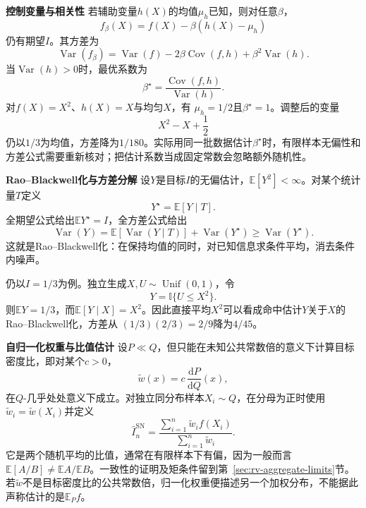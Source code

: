 \par\medskip\noindent\textbf{控制变量与相关性}\quad
若辅助变量\(h(X)\)的均值\(\mu_h\)已知，则对任意\(\beta\)，
\[ f_\beta(X)
  =f(X)-\beta(h(X)-\mu_h) \]
仍有期望\(I\)。其方差为
\[ \operatorname{Var}(f_\beta)
  =\operatorname{Var}(f)-2\beta\operatorname{Cov}(f,h)+\beta^2\operatorname{Var}(h). \]
当\(\operatorname{Var}(h)>0\)时，最优系数为
\[ \beta^\star
  =\frac{\operatorname{Cov}(f,h)}{\operatorname{Var}(h)}. \]
对\(f(X)=X^2\)、\(h(X)=X\)与均匀\(X\)，有
\(\mu_h=1/2\)且\(\beta^\star=1\)。调整后的变量
\[ X^2-X+\frac12 \]
仍以\(1/3\)为均值，方差降为\(1/180\)。实际用同一批数据估计\(\beta^\star\)时，有限样本无偏性和方差公式需要重新核对；把估计系数当成固定常数会忽略额外随机性。

\par\medskip\noindent\textbf{Rao--Blackwell化与方差分解}\quad
设\(Y\)是目标\(I\)的无偏估计，\(\mathbb{E}[Y^2]<\infty\)。对某个统计量\(T\)定义
\[ Y^\star=\mathbb{E}[Y\mid T]. \]
全期望公式给出\(\mathbb{E}Y^\star=I\)，全方差公式给出
\begin{equation}
  \operatorname{Var}(Y)
  =
  \mathbb{E}[\operatorname{Var}(Y\mid T)]
  +
  \operatorname{Var}(Y^\star)
  \geq
  \operatorname{Var}(Y^\star).
  \label{eq:probability-rao-blackwell-variance}
\end{equation}
这就是Rao--Blackwell化：在保持均值的同时，对已知信息求条件平均，消去条件内噪声。

仍以\(I=1/3\)为例。独立生成\(X,U\sim\operatorname{Unif}(0,1)\)，令
\[ Y=\mathbb{I}\{U\leq X^2\}. \]
则\(\mathbb{E}Y=1/3\)，而\(\mathbb{E}[Y\mid X]=X^2\)。因此直接平均\(X^2\)可以看成命中估计\(Y\)关于\(X\)的Rao--Blackwell化，方差从
\((1/3)(2/3)=2/9\)降为\(4/45\)。

\par\medskip\noindent\textbf{自归一化权重与比值估计}\quad
设\(P\ll Q\)，但只能在未知公共常数倍的意义下计算目标密度比，即对某个\(c>0\)，
\[
  \widetilde{w}(x)
  =
  c\,\frac{\mathrm{d}P}{\mathrm{d}Q}(x),
\]
在\(Q\)-几乎处处意义下成立。对独立同分布样本\(X_i\sim Q\)，在分母为正时使用
\(\widetilde{w}_i=\widetilde{w}(X_i)\)并定义
\begin{equation}
  \widehat{I}^{\mathrm{SN}}_n
  =
  \frac{\sum_{i=1}^{n}\widetilde{w}_if(X_i)}
       {\sum_{i=1}^{n}\widetilde{w}_i}.
  \label{eq:probability-self-normalized-importance-sampling}
\end{equation}
它是两个随机平均的比值，通常在有限样本下有偏，因为一般而言
\(\mathbb E[A/B]\ne\mathbb EA/\mathbb EB\)。一致性的证明及矩条件留到第~\ref{sec:rv-aggregate-limits}节。
若\(\widetilde w\)不是目标密度比的公共常数倍，归一化权重便描述另一个加权分布，不能据此声称估计的是\(\mathbb E_Pf\)。

